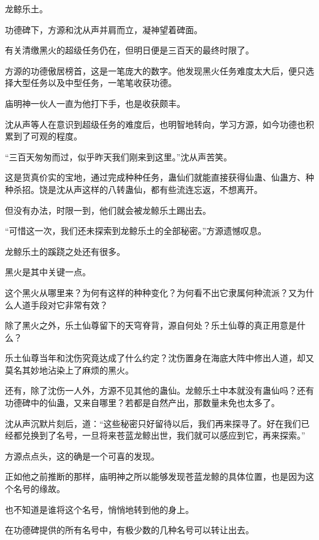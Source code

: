 
\begin{this_body}

龙鲸乐土。

功德碑下，方源和沈从声并肩而立，凝神望着碑面。

有关清缴黑火的超级任务仍在，但明日便是三百天的最终时限了。

方源的功德傲居榜首，这是一笔庞大的数字。他发现黑火任务难度太大后，便只选择大型任务以及中型任务，一笔笔收获功德。

庙明神一伙人一直为他打下手，也是收获颇丰。

沈从声等人在意识到超级任务的难度后，也明智地转向，学习方源，如今功德也积累到了可观的程度。

“三百天匆匆而过，似乎昨天我们刚来到这里。”沈从声苦笑。

这是货真价实的宝地，通过完成种种任务，蛊仙们就能直接获得仙蛊、仙蛊方、种种杀招。饶是沈从声这样的八转蛊仙，都有些流连忘返，不想离开。

但没有办法，时限一到，他们就会被龙鲸乐土踢出去。

“可惜这一次，我们还未探索到龙鲸乐土的全部秘密。”方源遗憾叹息。

龙鲸乐土的蹊跷之处还有很多。

黑火是其中关键一点。

这个黑火从哪里来？为何有这样的种种变化？为何看不出它隶属何种流派？又为什么人道手段对它非常有效？

除了黑火之外，乐土仙尊留下的天穹脊背，源自何处？乐土仙尊的真正用意是什么？

乐土仙尊当年和沈伤究竟达成了什么约定？沈伤置身在海底大阵中修出人道，却又莫名其妙地沾染上了麻烦的黑火。

还有，除了沈伤一人外，方源不见其他的蛊仙。龙鲸乐土中本就没有蛊仙吗？还有功德碑中的仙蛊，又来自哪里？若都是自然产出，那数量未免也太多了。

沈从声沉默片刻后，道：“这些秘密只好留待以后，我们再来探寻了。好在我们已经都兑换到了名号，一旦将来苍蓝龙鲸出世，我们就可以感应到它，再来探索。”

方源点点头，这的确是一个可喜的发现。

正如他之前推断的那样，庙明神之所以能够发现苍蓝龙鲸的具体位置，也是因为这个名号的缘故。

也不知道是谁将这个名号，悄悄地转到他的身上。

在功德碑提供的所有名号中，有极少数的几种名号可以转让出去。


\end{this_body}
